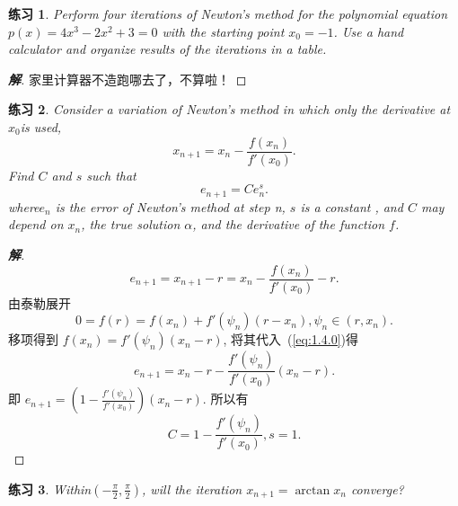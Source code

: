\documentclass[lang=cn,bibend=bibtex]{elegantpaper}
\theoremstyle{boldexercise}
\newtheorem{exercise}{练习}[section]
\newenvironment{solution}{\begin{proof}[\textbf{\emph 解}]}{\end{proof}}
\begin{document}
\begin{exercise}
  Perform four iterations of Newton's method for the polynomial equation $p(x)=4x^3-2x^2+3=0$ with the starting point $x_0=-1$. Use a hand calculator and organize results of the iterations in a table.
\end{exercise}
\begin{solution}
  家里计算器不造跑哪去了，不算啦！
\end{solution}
\begin{exercise}
  Consider a variation of Newton's method in which only the derivative at $x_0$is used,
  \begin{equation*}
    \label{eq:2}
   x_{n+1}=x_n-\frac{f(x_n)}{f'(x_0)}. 
  \end{equation*}
  Find $C$ and $s$ such that
  \begin{equation*}
    \label{eq:3}
   e_{n+1}=Ce_n^s. 
  \end{equation*}
  where$e_n$ is the error of Newton's method at step n, $s$ is a constant , and $C$ may depend on $x_n$, the true solution $\alpha$, and the derivative of the function $f$.
\end{exercise}
\begin{solution}
  \begin{equation}
    \label{eq:1.4.0}
    e_{n+1}=x_{n+1}-r=x_n-\frac{f(x_n)}{f'(x_0)}-r.
  \end{equation}
  由泰勒展开
  \begin{equation}
    \label{eq:1.4.1}
    0=f(r)=f(x_n)+f'(\psi_n)(r-x_n), \psi_n\in (r,x_n).
  \end{equation}
  移项得到
    $f(x_n)=f'(\psi_n)(x_n-r)$,
  将其代入~(\ref{eq:1.4.0})得
  \begin{equation}
    \label{eq:1.4.4}
    e_{n+1}=x_n-r-\frac{f'(\psi_n)}{f'(x_0)}(x_n-r). 
  \end{equation}
  即
   $ e_{n+1}=(1-\frac{f'(\psi_n)}{f'(x_0)})(x_n-r).$
  所以有
  \begin{equation}
    \label{eq:1.4.6}
    C=1-\frac{f'(\psi_n)}{f'(x_0)}, s=1.
  \end{equation}
\end{solution}
\begin{exercise}
 Within$(-\frac{\pi}{2},\frac{\pi}{2})$, will the iteration $x_{n+1}=\arctan x_n$ converge? 
\end{exercise}
\end{document}
